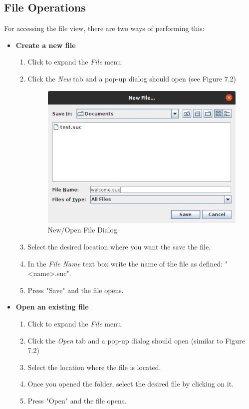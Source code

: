 \documentclass[12pt,a4paper,twoside]{report}
\begin{document}
\subsection{File Operations}
For accessing the file view, there are two ways of performing this:
\begin{itemize}
	\item \textbf{Create a new file}
	\begin{enumerate}
	\item Click to expand the \textit{File} menu.
	\item Click the \textit{New} tab and a pop-up dialog should open (see Figure 7.2)
	
\begin{figure}[H]
    \centering
    \includegraphics[width=0.6\linewidth]{img/userGuide/NewFileDialog.png}
    \caption{New/Open File Dialog}
    \label{fig:conf}
\end{figure}

	\item Select the desired location where you want the save the file.
	\item In the \textit{File Name} text box write the name of the file as defined: "<name>.suc".
	\item Press "Save" and the file opens.
	\end{enumerate}
	\item \textbf{Open an existing file}
	\begin{enumerate}
	\item Click to expand the \textit{File} menu.
	\item Click the \textit{Open} tab and a pop-up dialog should open (similar to Figure 7.2)
	\item Select the location where the file is located.
	\item Once you opened the folder, select the desired file by clicking on it.
	\item Press "Open" and the file opens.
	\end{enumerate}
\end{itemize}
\end{document}
